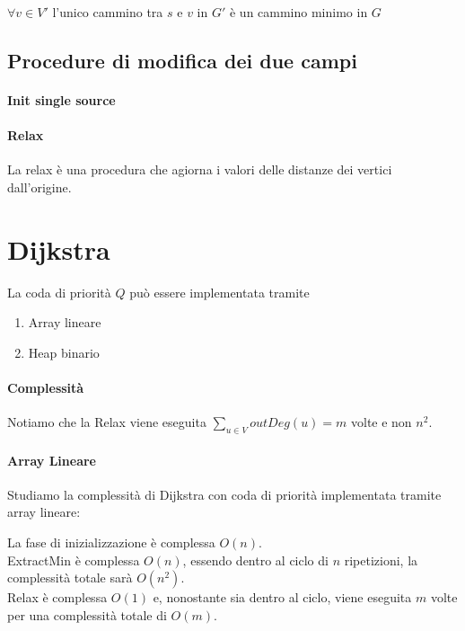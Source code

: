 {$\forall v \in V'$ l'unico cammino tra $s$ e $v$ in $G'$ è un cammino minimo in $G$}

\subsection{Procedure di modifica dei due campi}

\paragraph{Init single source}



\paragraph{Relax}

La relax è una procedura che agiorna i valori  delle distanze dei vertici dall'origine.





\section{Dijkstra}



{La coda di priorità $Q$ può essere implementata tramite}

\begin{enumerate}
\tightlist
\item
  {Array lineare}
\item
  {Heap binario}
\end{enumerate}

\paragraph{Complessità}

Notiamo che la Relax viene eseguita $\sum_{u \in V}{outDeg(u)} = m$ volte e non $n^2$.

\paragraph{Array Lineare}

{Studiamo la complessità di Dijkstra con coda di priorità implementata tramite array lineare:}

La fase di inizializzazione è complessa $O(n)$. \\
ExtractMin è complessa $O(n)$, essendo dentro al ciclo di $n$ ripetizioni, la complessità totale sarà $O(n^2)$. \\
Relax è complessa $O(1)$ e, nonostante sia dentro al ciclo, viene eseguita $m$ volte per una complessità totale di $O(m)$.


